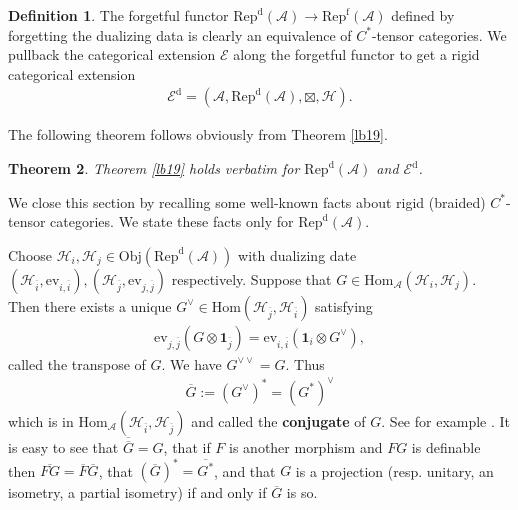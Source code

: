 \documentclass[12pt,a4paper]{article}
\theoremstyle{definition}
\newtheorem{df}{Definition}[section]
\theoremstyle{plain}
\newtheorem{thm}[df]{Theorem}
\newcommand{\mc}{\mathcal}
\newcommand{\ovl}{\overline}
\newcommand{\id}{\mathbf{1}}
\newcommand{\Hom}{\mathrm{Hom}}
\newcommand{\ev}{\mathrm{ev}}
\newcommand{\scr}{\mathscr}
\newcommand{\RepA}{\mathrm{Rep}(\mc A)}
\newcommand{\RepdA}{\mathrm{Rep}^{\mathrm d}(\mc A)}
\newcommand{\RepfA}{\mathrm{Rep}^{\mathrm f}(\mc A)}
\newcommand{\Obj}{\mathrm{Obj}}
\newcommand{\Ef}{\mathscr E^{\mathrm f}}
\newcommand{\Ed}{\mathscr E^{\mathrm d}}
\numberwithin{equation}{section}
\begin{document}
\begin{df}
The forgetful functor $\RepdA\rightarrow\RepfA$ defined by forgetting the dualizing data is clearly an equivalence of $C^*$-tensor categories. We pullback the categorical extension $\scr E$ along the forgetful functor to get a rigid categorical extension
\begin{align*}
	\Ed=(\mc A,\RepdA,\boxtimes,\mc H).
\end{align*}
\end{df}


The following theorem follows obviously from Theorem \ref{lb19}.

\begin{thm}
Theorem \ref{lb19} holds verbatim for $\RepdA$ and $\Ed$.
\end{thm}

We close this section by recalling some well-known facts about rigid (braided) $C^*$-tensor categories. We state these facts only for $\RepdA$.

Choose $\mc H_i,\mc H_j\in\Obj(\RepdA)$ with dualizing date $(\mc H_{\ovl i},\ev_{i,\ovl i}),(\mc H_{\ovl j},\ev_{j,\ovl j})$ respectively. Suppose that $G\in\Hom_{\mc A}(\mc H_i,\mc H_j)$. Then there exists a unique $G^\vee\in\Hom(\mc H_{\ovl j},\mc H_{\ovl i})$ satisfying
\begin{align}
	\ev_{j,\ovl j}(G\otimes\id_{\ovl j})=\ev_{i,\ovl i}(\id_i\otimes G^\vee),\label{eq36}
\end{align}
called the transpose of $G$. We have $G^{\vee\vee}=G$. Thus 
\begin{align}
	\ovl G:=(G^\vee)^*=(G^*)^\vee  \label{eq58}
\end{align}
which is in $\Hom_{\mc A}(\mc H_{\ovl i},\mc H_{\ovl j})$ and called the \textbf{conjugate} of $G$. See for example \cite{Yam04}. It is easy to see that $\ovl{\ovl G}=G$, that if $F$ is another morphism and $FG$ is definable then $\ovl{FG}=\ovl F\ovl G$, that $(\ovl G)^*=\ovl{G^*}$, and that $G$ is a projection (resp. unitary, an isometry, a partial isometry) if and only if $\ovl G$ is so. 
\end{document}
